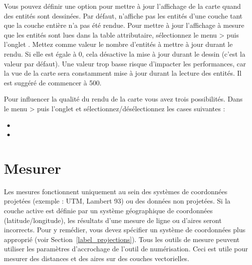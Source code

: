 Vous pouvez définir une option pour mettre à jour l'affichage de la carte quand 
des entités sont dessinées. Par défaut, \qg n'affiche pas les entités d'une 
couche tant que la couche entière n'a pas été rendue. Pour mettre à jour 
l'affichage à mesure que les entités sont lues dans la table attributaire, 
sélectionnez le menu  >  puis 
l'onglet . Mettez comme valeur le nombre d'entités à mettre 
à jour durant le rendu. Si elle est égale à 0, cela désactive la mise à jour 
durant le dessin (c'est la valeur par défaut). Une valeur trop basse risque 
d'impacter les performances, car la vue de la carte sera constamment mise à 
jour durant la lecture des entités. Il est suggéré de commencer à 500.

\label{label_renderquality} 

Pour influencer la qualité du rendu de la carte vous avez trois possibilités. 
Dans le menu  >  puis l'onglet 
 et sélectionnez/désélectionnez les cases suivantes :
\begin{itemize}[label=--]
\item {}
\item {}
\end{itemize}

\section{Mesurer} \label{sec:measure} 

Les mesures fonctionnent uniquement au sein des systèmes de coordonnées projetées 
(exemple : UTM, Lambert 93) ou des données non projetées. Si la couche active est 
définie par un système géographique de coordonnées (latitude/longitude), les 
résultats d'une mesure de ligne ou d'aires seront incorrects. Pour y remédier, 
vous devez spécifier un système de coordonnées plus approprié (voir Section~\ref{label_projections}). 
Tous les outils de mesure peuvent utiliser les paramètres d'accrochage de l'outil 
de numérisation. Ceci est utile pour mesurer des distances et des aires sur des 
couches vectorielles.

